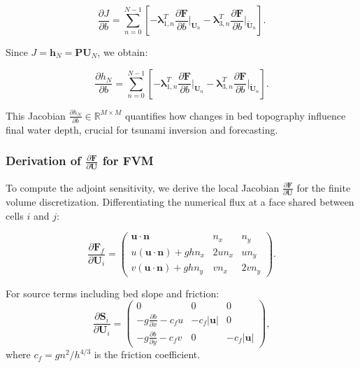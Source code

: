 \begin{equation}
\frac{\partial J}{\partial b} = \sum_{n=0}^{N-1} \left[
-\boldsymbol{\lambda}_{1,n}^T \frac{\partial \mathbf{F}}{\partial b} \Big|_{\mathbf{U}_n}
- \boldsymbol{\lambda}_{3,n}^T \frac{\partial \mathbf{F}}{\partial b} \Big|_{\widetilde{\mathbf{U}}_n}
\right].
\end{equation}

Since \( J = \mathbf{h}_N = \mathbf{P} \mathbf{U}_N \), we obtain:

\begin{equation}
\frac{\partial h_N}{\partial b} = \sum_{n=0}^{N-1} \left[
-\boldsymbol{\lambda}_{1,n}^T \frac{\partial \mathbf{F}}{\partial b} \Big|_{\mathbf{U}_n}
- \boldsymbol{\lambda}_{3,n}^T \frac{\partial \mathbf{F}}{\partial b} \Big|_{\widetilde{\mathbf{U}}_n}
\right].
\end{equation}

This Jacobian \( \frac{\partial h_N}{\partial b} \in \mathbb{R}^{M \times M} \) quantifies how changes in bed topography influence final water depth, crucial for tsunami inversion and forecasting.


\subsubsection*{Derivation of $\frac{\partial \mathbf{F}}{\partial \mathbf{U}}$ for FVM}
To compute the adjoint sensitivity, we derive the local Jacobian \( \frac{\partial \mathbf{F}}{\partial \mathbf{U}} \) for the finite volume discretization. Differentiating the numerical flux at a face shared between cells \( i \) and \( j \):

\begin{equation}
\frac{\partial \mathbf{F}_f}{\partial \mathbf{U}_i} =
\begin{pmatrix}
\mathbf{u} \cdot \mathbf{n} & n_x & n_y \\
u (\mathbf{u} \cdot \mathbf{n}) + g h n_x & 2 u n_x & u n_y \\
v (\mathbf{u} \cdot \mathbf{n}) + g h n_y & v n_x & 2 v n_y
\end{pmatrix}.
\end{equation}

For source terms including bed slope and friction:
\begin{equation}
\frac{\partial \mathbf{S}_i}{\partial \mathbf{U}_i} =
\begin{pmatrix}
0 & 0 & 0 \\
- g \frac{\partial b}{\partial x} - c_f u & -c_f |\mathbf{u}| & 0 \\
- g \frac{\partial b}{\partial y} - c_f v & 0 & -c_f |\mathbf{u}|
\end{pmatrix},
\end{equation}
where \( c_f = g n^2 / h^{4/3} \) is the friction coefficient.

